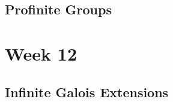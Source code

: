 \documentclass[12pt]{report}
\theoremstyle{definition}
\begin{document}
\section{Profinite Groups}

\chapter*{Week 12}
\setcounter{chapter}{11}

\section{Infinite Galois Extensions}






\end{document}
